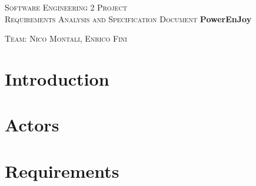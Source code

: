 \documentclass[a4paper,12pt,oneside]{book}
\begin{document}
	
	\pagestyle{empty}\centering
	\textsc{\Large Software Engineering 2 Project\\}
	\textsc{Requirements Analysis and Specification Document}
	\vfill
	\textbf{\Huge PowerEnJoy}
	
	\vfill
	\textsc{\Large Team: Nico Montali, Enrico Fini}
	
	\tableofcontents

	\begin{flushleft}
	\chapter{Introduction}\label{cap:Intro}
	
	\chapter{Actors}\label{cap:Actors}
	
	\chapter{Requirements}\label{cap:Requirements}
	
	\end{flushleft}
\end{document}
